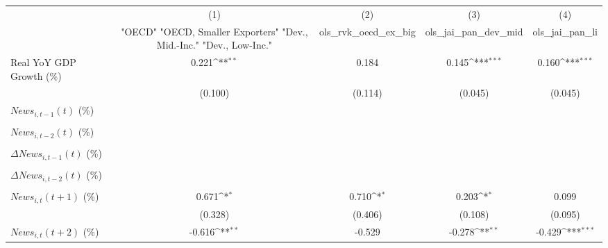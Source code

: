 {
\def\sym#1{\ifmmode^{#1}\else\(^{#1}\)\fi}
\begin{tabular}{l*{4}{c}}
\toprule
                    &\multicolumn{1}{c}{(1)}&\multicolumn{1}{c}{(2)}&\multicolumn{1}{c}{(3)}&\multicolumn{1}{c}{(4)}\\
                    &\multicolumn{1}{c}{ "OECD" "OECD, Smaller Exporters" "Dev., Mid.-Inc." "Dev., Low-Inc."}&\multicolumn{1}{c}{ols_rvk_oecd_ex_big}&\multicolumn{1}{c}{ols_jai_pan_dev_mid}&\multicolumn{1}{c}{ols_jai_pan_li}\\
\midrule
Real YoY GDP Growth (\%)&       0.221\sym{**} &       0.184         &       0.145\sym{***}&       0.160\sym{***}\\
                    &     (0.100)         &     (0.114)         &     (0.045)         &     (0.045)         \\
\addlinespace
$ News_{i,t-1}(t)$ (\%)&                     &                     &                     &                     \\
                    &                     &                     &                     &                     \\
\addlinespace
$ News_{i,t-2}(t)$ (\%)&                     &                     &                     &                     \\
                    &                     &                     &                     &                     \\
\addlinespace
$ \Delta News_{i,t-1}(t)$ (\%)&                     &                     &                     &                     \\
                    &                     &                     &                     &                     \\
\addlinespace
$ \Delta News_{i,t-2}(t)$ (\%)&                     &                     &                     &                     \\
                    &                     &                     &                     &                     \\
\addlinespace
$ News_{i,t}(t+1)$ (\%)&       0.671\sym{*}  &       0.710\sym{*}  &       0.203\sym{*}  &       0.099         \\
                    &     (0.328)         &     (0.406)         &     (0.108)         &     (0.095)         \\
\addlinespace
$ News_{i,t}(t+2)$ (\%)&      -0.616\sym{**} &      -0.529         &      -0.278\sym{**} &      -0.429\sym{***}\\

\end{tabular}}
